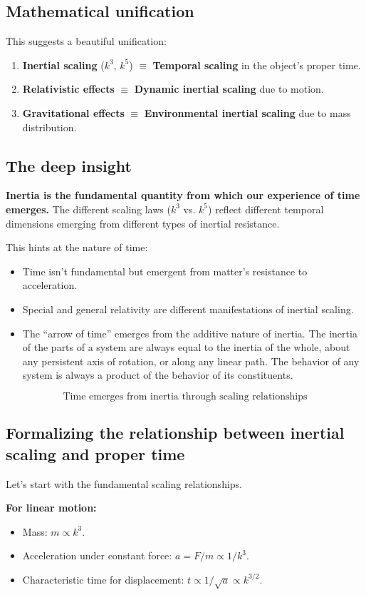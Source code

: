\subsection{Mathematical unification}
This suggests a beautiful unification:
\begin{enumerate}[leftmargin=0.5cm]
    \item \textbf{Inertial scaling} ($k^3$, $k^5$) $\equiv$ \textbf{Temporal scaling} in the object's proper time.
    \item \textbf{Relativistic effects} $\equiv$ \textbf{Dynamic inertial scaling} due to motion.
    \item \textbf{Gravitational effects} $\equiv$ \textbf{Environmental inertial scaling} due to mass distribution.
\end{enumerate}

\subsection{The deep insight}
\textbf{Inertia is the fundamental quantity from which our experience of time emerges.} The different scaling laws ($k^3$ vs.
$k^5$) reflect different temporal dimensions emerging from different types of inertial resistance.

This hints at the nature of time:
\begin{itemize}[leftmargin=0.5cm]
    \item Time isn't fundamental but emergent from matter's resistance to acceleration.
    \item Special and general relativity are different manifestations of inertial scaling.
    \item The ``arrow of time'' emerges from the additive nature of inertia. The inertia of the parts of a system are always equal to the inertia of the whole, about any persistent axis of rotation, or along any linear path. The behavior of any system is always a product of the behavior of its constituents.
\end{itemize}
\[
\boxed{\text{Time emerges from inertia through scaling relationships}}
\]

\subsection{Formalizing the relationship between inertial scaling and proper time}
Let's start with the fundamental scaling relationships.

\textbf{For linear motion:}
\begin{itemize}[leftmargin=0.5cm]
    \item Mass: $m \propto k^3$.
    \item Acceleration under constant force: $a = F/m \propto 1/k^3$.
    \item Characteristic time for displacement: $t \propto 1/\sqrt{a} \propto k^{3/2}$.
\end{itemize}


